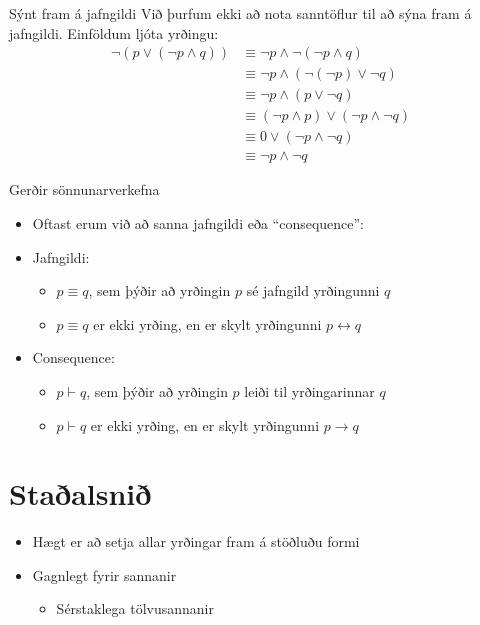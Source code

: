 \documentclass{beamer}
\begin{document}
\begin{frame}{Sýnt fram á jafngildi}
Við þurfum ekki að nota sanntöflur til að sýna fram á jafngildi. Einföldum ljóta yrðingu:
\begin{align*}
\lnot (p \lor (\lnot p \land q)) &\equiv \lnot p \land \lnot ( \lnot p \land q)\\
&\equiv \lnot p \land (\lnot (\lnot p) \lor \lnot q)\\
&\equiv \lnot p \land (p \lor \lnot q)\\
&\equiv (\lnot p \land p ) \lor (\lnot p \land \lnot q)\\
&\equiv 0 \lor (\lnot p \land \lnot q)\\
&\equiv \lnot p \land \lnot q
\end{align*}
\end{frame}

\begin{frame}{Gerðir sönnunarverkefna}
\begin{itemize}
 \item Oftast erum við að sanna jafngildi eða ``consequence'':
 \item Jafngildi:
 \begin{itemize}
  \item $p \equiv q$, sem þýðir að yrðingin $p$ sé jafngild yrðingunni $q$
  \item $p \equiv q$ er ekki yrðing, en er skylt yrðingunni $p \leftrightarrow q$
 \end{itemize}
 \item Consequence:
 \begin{itemize}
  \item $p \vdash q$, sem þýðir að yrðingin $p$ leiði til yrðingarinnar $q$
  \item $p \vdash q$ er ekki yrðing, en er skylt yrðingunni $p \rightarrow q$
 \end{itemize}
\end{itemize}
\end{frame}


\section{Staðalsnið}

\begin{frame}
\begin{itemize}
 \item Hægt er að setja allar yrðingar fram á stöðluðu formi
 \item Gagnlegt fyrir sannanir
 \begin{itemize}
  \item Sérstaklega tölvusannanir
 \end{itemize}
\end{itemize}
\end{frame}
\end{document}
